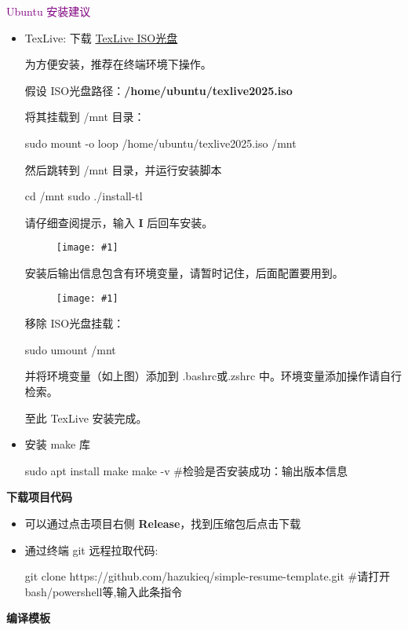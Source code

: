 \documentclass[a4paper,12pt]{ctexart}
\newenvironment{pul}[1]{
	\begin{itemize}[topsep=0pt,labelsep=.5em,leftmargin=\the\dimexpr 0.5em+ #1\relax,itemsep=0em,parsep=.5em]
	}{\end{itemize}}
\newenvironment{ul}{
	\begin{itemize}[topsep=0pt,labelsep=.5em,leftmargin=4.5em,itemsep=-.5em]
	}{\end{itemize}}
\newcommand{\pic}[1]{
	\begin{figure}[!h]
		\centering
		\texttt{[image: \#1]}
	\end{figure}
}
\begin{document}
	\qquad \textcolor{purple}{Ubuntu 安装建议}
	\begin{pul}{6em}
		\item
		TexLive: 下载 \href{https://mirrors.tuna.tsinghua.edu.cn/CTAN/systems/texlive/Images/texlive2025-20250308.iso}{TexLive ISO光盘}
		
		为方便安装，推荐在终端环境下操作。
		
		假设 ISO光盘路径：\textbf{/home/ubuntu/texlive2025.iso}
		
		将其挂载到 /mnt 目录：
		
		\begin{bashcode}
    sudo mount -o loop /home/ubuntu/texlive2025.iso /mnt
		\end{bashcode}
		
		然后跳转到 /mnt 目录，并运行安装脚本
		\begin{bashcode}
	cd /mnt
	sudo ./install-tl
		\end{bashcode}
		请仔细查阅提示，输入 \textbf{I} 后回车安装。
		\pic{texlive-install-hint.png}
		
		安装后输出信息包含有环境变量，请暂时记住，后面配置要用到。
		\pic{texlive-envs.png}
		
		移除 ISO光盘挂载：
		\begin{bashcode}
	sudo umount /mnt
		\end{bashcode}
		
		并将环境变量（如上图）添加到 .bashrc或.zshrc 中。环境变量添加操作请自行检索。
		
		至此 TexLive 安装完成。
		
		
		\item
		安装 make 库
		\begin{bashcode}
	sudo apt install make
	make -v #检验是否安装成功：输出版本信息
		\end{bashcode} 
	
	\end{pul}
	 
	\textbf{下载项目代码}
	\begin{ul}
		\item 可以通过点击项目右侧 \textbf{Release}，找到压缩包后点击下载
		\item
		通过终端 git 远程拉取代码:
		\begin{bashcode}[xleftmargin=2em]
  git clone https://github.com/hazukieq/simple-resume-template.git	#请打开 bash/powershell等,输入此条指令
		\end{bashcode}
	\end{ul}
	
	\textbf{编译模板}
\end{document}
